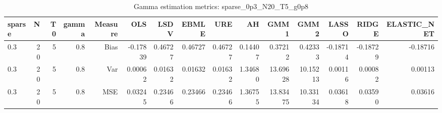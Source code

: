 \begin{table}[!htbp]\centering
\caption{Gamma estimation metrics: sparse_0p3_N20_T5_g0p8}
\label{tab:table1_sparse_0p3_N20_T5_g0p8}
\begin{tabular}{lrrrrrrrrrrrrrr}
\hline
sparse & N & T0 & gamma & Measure & OLS & LSDV & EBMLE & URE & AH & GMM1 & GMM2 & LASSO & RIDGE & ELASTIC_NET \\
\hline
0.3 & 20 & 5 & 0.8 & Bias & -0.17839 & 0.46727 & 0.46727 & 0.46727 & 0.14407 & 0.37212 & 0.42333 & -0.18714 & -0.18729 & -0.18716 \\
0.3 & 20 & 5 & 0.8 & Var & 0.00062 & 0.01632 & 0.01632 & 0.01632 & 1.34680 & 13.69628 & 10.15213 & 0.00116 & 0.00082 & 0.00113 \\
0.3 & 20 & 5 & 0.8 & MSE & 0.03245 & 0.23466 & 0.23466 & 0.23466 & 1.36755 & 13.83475 & 10.33134 & 0.03618 & 0.03590 & 0.03616 \\
\hline
\end{tabular}
\end{table}

